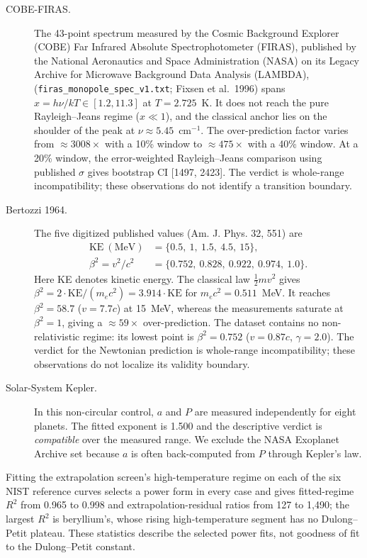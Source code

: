 \documentclass{article}
\begin{document}
\begin{description}
\item[COBE-FIRAS.] The 43-point spectrum measured by the Cosmic Background Explorer (COBE) Far Infrared Absolute Spectrophotometer (FIRAS), published by the National Aeronautics and Space Administration (NASA) on its Legacy Archive for Microwave Background Data Analysis (LAMBDA),
(\nolinkurl{firas_monopole_spec_v1.txt}; Fixsen et al.~1996) spans
$x = h\nu/kT \in [1.2, 11.3]$ at $T = 2.725$~K. It does not reach the pure
Rayleigh--Jeans regime ($x \ll 1$), and the classical anchor lies on the shoulder of the
peak at $\nu \approx 5.45$~cm$^{-1}$. The over-prediction factor varies from
${\approx}3008\times$ with a 10\% window to ${\approx}475\times$ with a 40\% window. At a
20\% window, the error-weighted Rayleigh--Jeans comparison using published $\sigma$ gives
bootstrap CI [1497, 2423]. The verdict is whole-range incompatibility; these observations do not identify a transition
boundary.
\item[Bertozzi 1964.] The five digitized published values (Am. J. Phys. 32, 551) are
\begin{align*}
\mathrm{KE}\ (\mathrm{MeV}) &= \{0.5,\ 1,\ 1.5,\ 4.5,\ 15\},\\
\beta^{2} = v^{2}/c^{2} &= \{0.752,\ 0.828,\ 0.922,\ 0.974,\ 1.0\}.
\end{align*}
Here KE denotes kinetic energy. The classical law
$\tfrac{1}{2}mv^{2}$ gives $\beta^{2} = 2\cdot\mathrm{KE}/(m_ec^{2}) = 3.914\cdot\mathrm{KE}$
for $m_ec^{2} = 0.511$~MeV. It reaches $\beta^{2} = 58.7$ ($v = 7.7c$) at 15~MeV, whereas
the measurements saturate at $\beta^{2} = 1$, giving a ${\approx}59\times$ over-prediction.
The dataset contains no non-relativistic regime: its lowest point is
$\beta^{2} = 0.752$ ($v = 0.87c$, $\gamma = 2.0$). The verdict for the Newtonian prediction is whole-range
incompatibility; these observations do not localize its validity boundary.
\item[Solar-System Kepler.] In this non-circular control, $a$ and $P$ are measured
independently for eight planets. The fitted exponent is 1.500 and the descriptive verdict
is \emph{compatible} over the measured range. We exclude the NASA
Exoplanet Archive set because $a$ is often back-computed from $P$ through Kepler's law.
\end{description}

Fitting the extrapolation screen's high-temperature regime on each of the six NIST reference curves selects a power form in every case and gives fitted-regime $R^{2}$ from 0.965 to 0.998 and extrapolation-residual ratios from 127 to 1,490; the largest $R^{2}$ is beryllium's, whose rising high-temperature segment has no Dulong--Petit plateau. These statistics describe the selected power fits, not goodness of fit to the Dulong--Petit constant.
\end{document}
